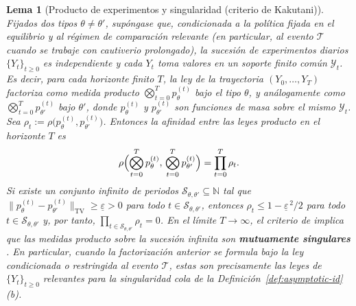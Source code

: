 \documentclass[12pt]{article}
\providecommand{\textcite}{\citet}
\newtheorem{lemma}[theorem]{Lema}
\theoremstyle{definition}
\theoremstyle{remark}
\newcommand{\1}{\mathbf{1}}
\begin{document}
\begin{lemma}[Producto de experimentos y singularidad \textup{(}criterio de Kakutani\textup{)}]
\label{lem:general-id-appendix}
Fijados dos tipos $\theta\neq\theta'$, supóngase que, condicionada a la política fijada en el equilibrio y al régimen de comparación relevante \textup{(}en particular, al evento $\mathcal{T}$ cuando se trabaje con cautiverio prolongado\textup{)}, la sucesión de experimentos diarios $\{Y_t\}_{t\ge 0}$ es independiente y cada $Y_t$ toma valores en un soporte finito común $\mathcal{Y}_t$. Es decir, para cada horizonte finito $T$, la ley de la trayectoria $(Y_0,\ldots,Y_T)$ factoriza como medida producto $\bigotimes_{t=0}^{T} p_\theta^{(t)}$ bajo el tipo $\theta$, y análogamente como $\bigotimes_{t=0}^{T} p_{\theta'}^{(t)}$ bajo $\theta'$, donde $p_\theta^{(t)}$ y $p_{\theta'}^{(t)}$ son funciones de masa sobre el mismo $\mathcal{Y}_t$. Sea $\rho_t:=\rho\bigl(p_\theta^{(t)},p_{\theta'}^{(t)}\bigr)$. Entonces la afinidad entre las leyes producto en el horizonte $T$ es
\begin{equation}
\label{eq:appendix-rho-product}
\rho\Bigl(\bigotimes_{t=0}^{T} p_\theta^{(t)},\,\bigotimes_{t=0}^{T} p_{\theta'}^{(t)}\Bigr)=\prod_{t=0}^{T}\rho_t.
\end{equation}
Si existe un conjunto infinito de periodos $\mathcal{S}_{\theta,\theta'}\subseteq\mathbb{N}$ tal que $\|p_\theta^{(t)}-p_{\theta'}^{(t)}\|_{\mathrm{TV}}\ge \underline{\varepsilon}>0$ para todo $t\in\mathcal{S}_{\theta,\theta'}$, entonces $\rho_t\le 1-\underline{\varepsilon}^{\,2}/2$ para todo $t\in\mathcal{S}_{\theta,\theta'}$ y, por tanto, $\prod_{t\in\mathcal{S}_{\theta,\theta'}}\rho_t=0$. En el límite $T\to\infty$, el criterio de \textcite{Kakutani1948} implica que las medidas producto sobre la sucesión infinita son \textbf{mutuamente singulares} \textcite{Shiryaev2019Probability}. En particular, cuando la factorización anterior se formula bajo la ley condicionada o restringida al evento $\mathcal{T}$, estas son precisamente las leyes de $\{Y_t\}_{t\ge 0}$ relevantes para la singularidad cola de la Definición~\ref{def:asymptotic-id}\textup{(b)}.
\end{lemma}
\end{document}
